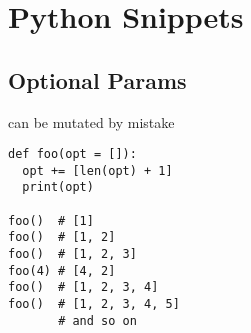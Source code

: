 \section{Python Snippets}
\subsection*{Optional Params}
can be mutated by mistake
\begin{verbatim}
def foo(opt = []):
  opt += [len(opt) + 1]
  print(opt)

foo()  # [1]
foo()  # [1, 2]
foo()  # [1, 2, 3]
foo(4) # [4, 2]
foo()  # [1, 2, 3, 4]
foo()  # [1, 2, 3, 4, 5]
       # and so on
\end{verbatim}